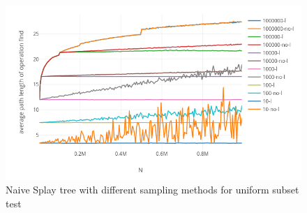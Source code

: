 \documentclass{article}
\begin{document}
\begin{figure}[h!]
\centering
\includegraphics[width=\textwidth]{NTIN066-plot6.png}
\caption{Naive Splay tree with different sampling methods for uniform subset test}
\label{fig:plot6}
\end{figure}
\end{document}
